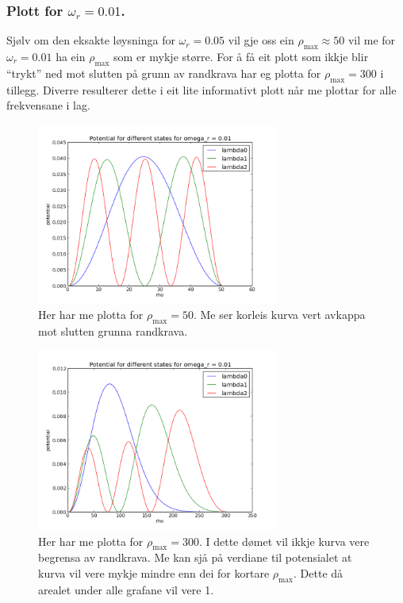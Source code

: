 \documentclass[11pt, a4paper]{article}
\begin{document}
    \subsubsection{Plott for $\omega_r = 0.01$.} 
      Sjølv om den eksakte løysninga for $\omega_r = 0.05$ vil gje oss ein $\rho_{\text{max}} \approx 50$ vil me for $\omega_r = 0.01$ ha ein $\rho_{\text{max}}$ som er mykje større.  
      For å få eit plott som ikkje blir ``trykt'' ned mot slutten på grunn av randkrava har eg plotta for $\rho_{\text{max}} = 300$ i tillegg. Diverre resulterer dette i eit lite 
      informativt plott når me plottar for alle frekvensane i lag.
      \begin{figure}[H]
        \centering
        \includegraphics[width=300px]{omega001kort.png}
        \caption{Her har me plotta for $\rho_{\text{max}} = 50$. Me ser korleis kurva vert avkappa mot slutten grunna randkrava.}
      \end{figure}
      \begin{figure}[H]
        \centering
        \includegraphics[width=300px]{omega001lang.png}
        \caption{Her har me plotta for $\rho_{\text{max}} = 300$. I dette dømet vil ikkje kurva vere begrensa av randkrava. Me kan sjå på verdiane til potensialet at kurva vil vere 
        mykje mindre enn dei for kortare $\rho_{\text{max}}$. Dette då arealet under alle grafane vil vere 1.}
      \end{figure}
\end{document}
